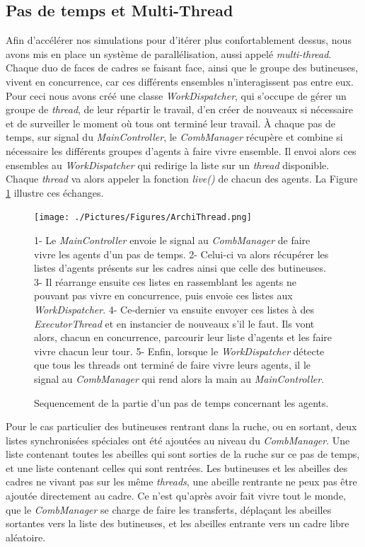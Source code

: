 			\subsection{Pas de temps et Multi-Thread}
			Afin d'accélérer nos simulations pour d'itérer plus confortablement dessus, nous avons mis en place un système de parallélisation, aussi appelé \textit{multi-thread}. Chaque duo de faces de cadres se faisant face, ainsi que le groupe des butineuses, vivent en concurrence, car ces différents ensembles n'interagissent pas entre eux. Pour ceci nous avons créé une classe \textit{WorkDispatcher}, qui s'occupe de gérer un groupe de \textit{thread}, de leur répartir le travail, d'en créer de nouveaux si nécessaire et de surveiller le moment où tous ont terminé leur travail. À chaque pas de temps, sur signal du \textit{MainController}, le \textit{CombManager} récupère et combine si nécessaire les différents groupes d'agents à faire vivre ensemble. Il envoi alors ces ensembles au \textit{WorkDispatcher} qui redirige la liste sur un \textit{thread} disponible. Chaque \textit{thread} va alors appeler la fonction \textit{live()} de chacun des agents. La Figure \ref{ArchiThread} illustre ces échanges.
			
			\begin{figure}
			\centering
			\texttt{[image: ./Pictures/Figures/ArchiThread.png]}
			\caption{Sequencement de la partie d'un pas de temps concernant les agents.}{1- Le \textit{MainController} envoie le signal au \textit{CombManager} de faire vivre les agents d'un pas de temps. 2- Celui-ci va alors récupérer les listes d'agents présents sur les cadres ainsi que celle des butineuses. 3- Il réarrange ensuite ces listes en rassemblant les agents ne pouvant pas vivre en concurrence, puis envoie ces listes aux \textit{WorkDispatcher}. 4- Ce-dernier va ensuite envoyer ces listes à des \textit{ExecutorThread} et en instancier de nouveaux s'il le faut. Ils vont alors, chacun en concurrence, parcourir leur liste d'agents et les faire vivre chacun leur tour. 5- Enfin, lorsque le \textit{WorkDispatcher} détecte que tous les threads ont terminé de faire vivre leurs agents, il le signal au \textit{CombManager} qui rend alors la main au \textit{MainController}.}
			\label{ArchiThread}
			\end{figure}
			
			Pour le cas particulier des butineuses rentrant dans la ruche, ou en sortant, deux listes synchronisées spéciales ont été ajoutées au niveau du \textit{CombManager}. Une liste contenant toutes les abeilles qui sont sorties de la ruche sur ce pas de temps, et une liste contenant celles qui sont rentrées. Les butineuses et les abeilles des cadres ne vivant pas sur les même \textit{threads}, une abeille rentrante ne peux pas être ajoutée directement au cadre. Ce n'est qu'après avoir fait vivre tout le monde, que le \textit{CombManager} se charge de faire les transferts, déplaçant les abeilles sortantes vers la liste des butineuses, et les abeilles entrante vers un cadre libre aléatoire.
			
